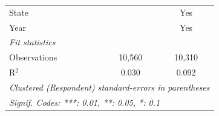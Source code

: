 \begin{tabular}{lcc}
   State                          &               & Yes\\  
   Year                           &               & Yes\\  
   \midrule
   \emph{Fit statistics}\\
   Observations                   & 10,560        & 10,310\\  
   R$^2$                          & 0.030         & 0.092\\  
   \midrule \midrule
   \multicolumn{3}{l}{\emph{Clustered (Respondent) standard-errors in parentheses}}\\
   \multicolumn{3}{l}{\emph{Signif. Codes: ***: 0.01, **: 0.05, *: 0.1}}\\
\end{tabular}
\par\endgroup


